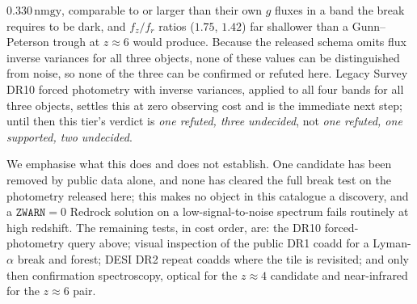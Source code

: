 \documentclass[aps,prd,twocolumn,superscriptaddress,nofootinbib,longbibliography,floatfix]{revtex4-2}
\newcommand{\ZWARN}{\texttt{ZWARN}}
\newcommand{\nmgy}{\,\mathrm{nmgy}}
\begin{document}
\begin{description}[leftmargin=0em,itemsep=3pt]
    $0.330\nmgy$, comparable to or larger than their own $g$ fluxes in a band
    the break requires to be dark, and $f_z/f_r$ ratios ($1.75$, $1.42$) far
    shallower than a Gunn--Peterson trough at $z\approx6$ would produce.
    Because the released schema omits flux inverse variances for all three
    objects, none of these values can be distinguished from noise, so none of
    the three can be confirmed or refuted here. Legacy Survey DR10 forced
    photometry with inverse variances, applied to all four bands for all
    three objects, settles this at zero observing cost and is the immediate
    next step; until then this tier's verdict is \emph{one refuted, three
    undecided}, not \emph{one refuted, one supported, two undecided}.
\end{description}

We emphasise what this does and does not establish. One candidate has been
removed by public data alone, and none has cleared the full break test on
the photometry released here; this makes no object in this catalogue a
discovery, and a $\ZWARN = 0$ Redrock solution on a low-signal-to-noise
spectrum fails routinely at high redshift. The remaining tests, in cost
order, are: the DR10 forced-photometry query above; visual inspection of the
public DR1 coadd for a Lyman-$\alpha$ break and forest; DESI DR2 repeat
coadds where the tile is revisited; and only then confirmation spectroscopy,
optical for the $z \approx 4$ candidate and near-infrared for the $z \approx
6$ pair.
\end{document}
